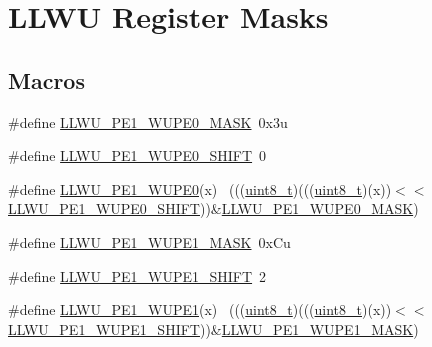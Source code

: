 \hypertarget{group___l_l_w_u___register___masks}{}\section{L\+L\+WU Register Masks}
\label{group___l_l_w_u___register___masks}
\subsection*{Macros}
\begin{DoxyCompactItemize}
\item 
\#define \hyperlink{group___l_l_w_u___register___masks_ga6ed6c56a8797caa64d27eb915c164dad}{L\+L\+W\+U\+\_\+\+P\+E1\+\_\+\+W\+U\+P\+E0\+\_\+\+M\+A\+SK}~0x3u
\item 
\#define \hyperlink{group___l_l_w_u___register___masks_ga234c02ee9c2b3e3e248c90473e922336}{L\+L\+W\+U\+\_\+\+P\+E1\+\_\+\+W\+U\+P\+E0\+\_\+\+S\+H\+I\+FT}~0
\item 
\#define \hyperlink{group___l_l_w_u___register___masks_gad0111a325ce3f549a1726373cde88f96}{L\+L\+W\+U\+\_\+\+P\+E1\+\_\+\+W\+U\+P\+E0}(x)                                            ~(((\hyperlink{_p_e___types_8h_aba7bc1797add20fe3efdf37ced1182c5}{uint8\+\_\+t})(((\hyperlink{_p_e___types_8h_aba7bc1797add20fe3efdf37ced1182c5}{uint8\+\_\+t})(x))$<$$<$\hyperlink{group___l_l_w_u___register___masks_ga234c02ee9c2b3e3e248c90473e922336}{L\+L\+W\+U\+\_\+\+P\+E1\+\_\+\+W\+U\+P\+E0\+\_\+\+S\+H\+I\+FT}))\&\hyperlink{group___l_l_w_u___register___masks_ga6ed6c56a8797caa64d27eb915c164dad}{L\+L\+W\+U\+\_\+\+P\+E1\+\_\+\+W\+U\+P\+E0\+\_\+\+M\+A\+SK})
\item 
\#define \hyperlink{group___l_l_w_u___register___masks_gac0c417f78992f2ebaca7267ef06d888a}{L\+L\+W\+U\+\_\+\+P\+E1\+\_\+\+W\+U\+P\+E1\+\_\+\+M\+A\+SK}~0x\+Cu
\item 
\#define \hyperlink{group___l_l_w_u___register___masks_gaa9b8224f389f9c3d4f13772d8e5fbeee}{L\+L\+W\+U\+\_\+\+P\+E1\+\_\+\+W\+U\+P\+E1\+\_\+\+S\+H\+I\+FT}~2
\item 
\#define \hyperlink{group___l_l_w_u___register___masks_ga51ac5ef18e9ddf78bd29e79575408a00}{L\+L\+W\+U\+\_\+\+P\+E1\+\_\+\+W\+U\+P\+E1}(x)                                            ~(((\hyperlink{_p_e___types_8h_aba7bc1797add20fe3efdf37ced1182c5}{uint8\+\_\+t})(((\hyperlink{_p_e___types_8h_aba7bc1797add20fe3efdf37ced1182c5}{uint8\+\_\+t})(x))$<$$<$\hyperlink{group___l_l_w_u___register___masks_gaa9b8224f389f9c3d4f13772d8e5fbeee}{L\+L\+W\+U\+\_\+\+P\+E1\+\_\+\+W\+U\+P\+E1\+\_\+\+S\+H\+I\+FT}))\&\hyperlink{group___l_l_w_u___register___masks_gac0c417f78992f2ebaca7267ef06d888a}{L\+L\+W\+U\+\_\+\+P\+E1\+\_\+\+W\+U\+P\+E1\+\_\+\+M\+A\+SK})

\end{DoxyCompactItemize}
